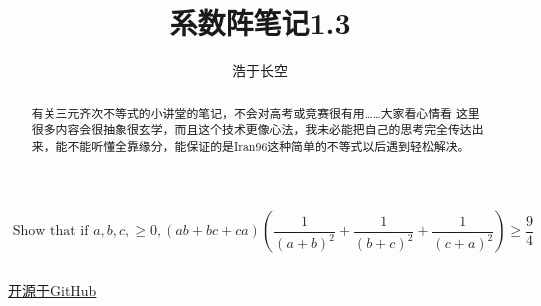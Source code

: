 \documentclass[UTF8]{ctexart}
\begin{document}
	

\title{系数阵笔记1.3}
\author{浩于长空}


\maketitle

$$\text { Show that if } a, b, c,\geq 0,(a b+b c+c a)\left(\frac{1}{(a+b)^{2}}+\frac{1}{(b+c)^{2}}+\frac{1}{(c+a)^{2}}\right) \geq \frac{9}{4}
$$
\begin{flushright}
\end{flushright}
\begin{displaymath}
\end{displaymath}

\begin{center}
	\href{https://github.com/Raymond0Hui/LaTeXwork-open}{开源于GitHub}
\end{center}

\begin{abstract}
	有关三元齐次不等式的小讲堂的笔记，不会对高考或竞赛很有用……大家看心情看
	这里很多内容会很抽象很玄学，而且这个技术更像心法，我未必能把自己的思考完全传达出来，能不能听懂全靠缘分，能保证的是Iran96这种简单的不等式以后遇到轻松解决。
\end{abstract}

\newpage
\end{document}

